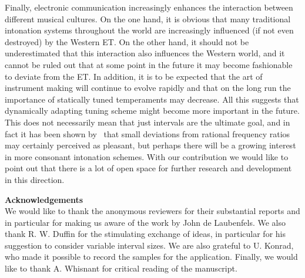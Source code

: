 Finally, electronic communication increasingly enhances the interaction between different musical cultures. On the one hand, it is obvious that many traditional intonation systems throughout the world are increasingly influenced (if not even destroyed) by the Western ET. On the other hand, it should not be underestimated that this interaction also influences the Western world, and it cannot be ruled out that at some point in the future it may become fashionable to deviate from the ET. In addition, it is to be expected that the art of instrument making will continue to evolve rapidly and that on the long run the importance of statically tuned temperaments may decrease. All this suggests that dynamically adapting tuning scheme might become more important in the future. This does not necessarily mean that just intervals are the ultimate goal, and in fact it has been shown by~\cite{mathews} that small deviations from rational frequency ratios may certainly perceived as pleasant, but perhaps there will be a growing interest in more consonant intonation schemes. With our contribution we would like to point out that there is a lot of open space for further research and development in this direction.

\vspace{2mm}
\noindent
\textbf{Acknowledgements}\\
We would like to thank the anonymous reviewers for their substantial reports and in particular for making us aware of the work by John de Laubenfels. We also thank R. W. Duffin for the stimulating exchange of ideas, in particular for his suggestion to consider variable interval sizes. We are also grateful to U. Konrad, who made it possible to record the samples for the application. Finally, we would like to thank A. Whisnant for critical reading of the manuscript. 
